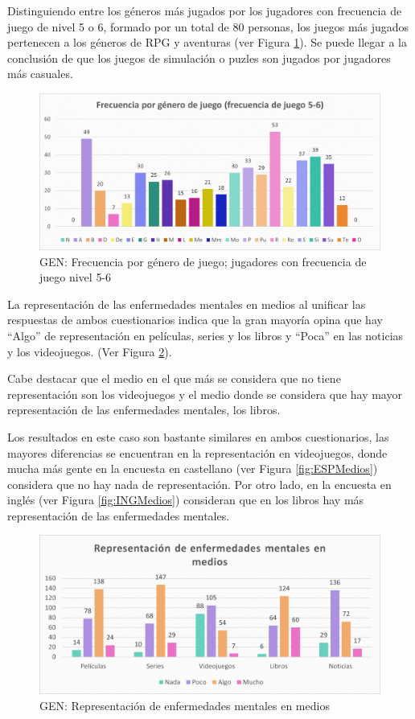 \documentclass[12pt, a4paper,twoside,titlepage]{book}
\begin{document}
 Distinguiendo entre los géneros más jugados por los jugadores con frecuencia de juego de nivel 5 o 6, formado por un total de 80 personas, los juegos más jugados pertenecen a los géneros de RPG y aventuras (ver Figura \ref{fig:Frecgen56}). Se puede llegar a la conclusión de que los juegos de simulación o puzles son jugados por jugadores más casuales. 
 
 \begin{figure}
\centering
 \includegraphics[width=.8\linewidth]{ANEXO Gen/8AnexGENFrecgen56}
 \caption{GEN: Frecuencia por género de juego; jugadores con frecuencia de juego nivel 5-6}
 \label{fig:Frecgen56}
 \end{figure}
 
 
La representación de las enfermedades mentales en medios al unificar las respuestas de ambos cuestionarios indica que la gran mayoría opina que hay “Algo” de representación en películas, series y los libros y “Poca” en las noticias y los videojuegos. (Ver Figura \ref{fig:Medios}). 

Cabe destacar que el medio en el que más se considera que no tiene representación son los videojuegos y el medio donde se considera que hay mayor representación de las enfermedades mentales, los libros. 

Los resultados en este caso son bastante similares en ambos cuestionarios, las mayores diferencias se encuentran en la representación en videojuegos, donde mucha más gente en la encuesta en castellano (ver Figura \ref{fig:ESPMedios}) considera que no hay nada de representación. Por otro lado, en la encuesta en inglés (ver Figura \ref{fig:INGMedios}) consideran que en los libros hay más representación de las enfermedades mentales. 


\begin{figure}
\centering
 \includegraphics[width=.9\linewidth]{Imagenes Form GEN/5GENMedio}
 \caption{GEN: Representación de enfermedades mentales en medios}
 \label{fig:Medios}
 \end{figure}
\end{document}
